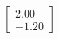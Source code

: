 \documentclass[preview]{standalone}
\begin{document}
\begin{align*}
\begin{bmatrix} 2.00 \\ -1.20 \end{bmatrix}
\end{align*}
\end{document}
